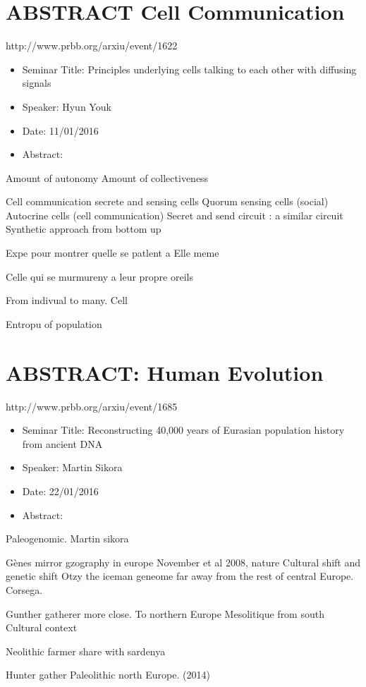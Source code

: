 \documentclass[10pt,letterpaper]{article}
\begin{document}
\section{ABSTRACT Cell Communication}
http://www.prbb.org/arxiu/event/1622
\begin{itemize}
    \item Seminar Title: Principles underlying cells talking to each other with diffusing signals
    \item Speaker: Hyun Youk
    \item Date: 11/01/2016
    \item Abstract:
\end{itemize}


Amount of autonomy
Amount of collectiveness

Cell communication secrete and sensing cells
Quorum sensing cells (social)
Autocrine cells (cell communication)
Secret and send circuit : a similar circuit
Synthetic approach from bottom up

Expe pour montrer quelle se patlent a Elle meme

Celle qui se murmureny a leur propre oreils

From indivual to many. Cell

Entropu of population


\section{ABSTRACT: Human Evolution}
http://www.prbb.org/arxiu/event/1685

\begin{itemize}
    \item Seminar Title: Reconstructing 40,000 years of Eurasian population history from ancient DNA
    \item Speaker: Martin Sikora
    \item Date: 22/01/2016
    \item Abstract: 
\end{itemize}
Paleogenomic. Martin sikora

Gènes mirror gzography in europe
November et al 2008, nature
Cultural shift and genetic shift
Otzy the iceman geneome far away from the rest of central Europe.
Corsega.

Gunther gatherer more close. To northern Europe
Mesolitique from south
Cultural context

Neolithic farmer share with sardenya

Hunter gather Paleolithic north Europe.
(2014)
\end{document}
